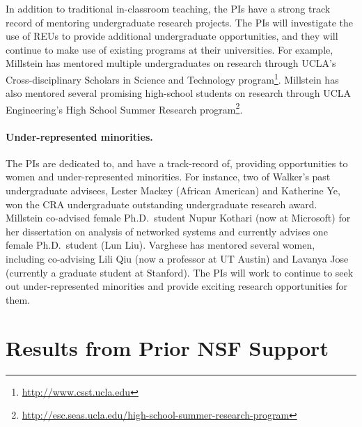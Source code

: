 In addition to traditional in-classroom teaching, the PIs have a strong 
track record of mentoring
undergraduate research projects.
The PIs will
investigate the use of REUs to provide additional undergraduate opportunities, and they will continue to make use of existing programs at their universities. For example, Millstein has mentored multiple undergraduates on research through UCLA's Cross-disciplinary Scholars in Science and Technology program\footnote{\url{http://www.csst.ucla.edu}}.
Millstein has also mentored several promising high-school students on research through UCLA Engineering's High School Summer Research program\footnote{\url{http://esc.seas.ucla.edu/high-school-summer-research-program}}.

\paragraph*{Under-represented minorities.} The PIs are dedicated
to, and have a track-record of, providing opportunities to women and under-represented 
minorities.  For instance, two of Walker's past undergraduate advisees,
Lester Mackey (African American) and Katherine Ye, won the CRA undergraduate 
outstanding undergraduate
research award.
Millstein co-advised female Ph.D.\ student Nupur Kothari (now at Microsoft) for her dissertation on analysis of networked systems and currently advises one female Ph.D.\ student (Lun Liu).  Varghese has mentored several women, including
co-advising Lili Qiu (now a professor at UT Austin) and Lavanya Jose (currently a graduate student at Stanford).
The PIs will work to continue to seek out under-represented minorities and provide exciting 
research opportunities for them.

\section{Results from Prior NSF Support}
\label{sec:prior-support}

